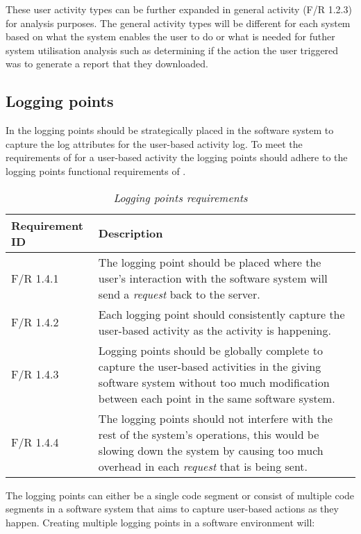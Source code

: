 These user activity types can be further expanded in general activity (F/R 1.2.3) for analysis purposes. The general activity types will be different for each system based on what the system enables the user to do or what is needed for futher system utilisation analysis such as determining if the action the user triggered was to generate a report that they downloaded.

\subsection{Logging points}\label{sec:ch2_loggingPoints}
In  the logging points should be strategically placed in the software system to capture the log attributes for the user-based activity log. To meet the requirements of  for a user-based activity the logging points should adhere to the logging points functional requirements of .

\begin{table}[!htb]
	\centering
	\caption[Logging points requirements]
	{\textit{Logging points requirements}}
	\label{tbl:ch2_loggingPointRequirement}
	\begin{tabularx}{\textwidth}{|l|X|}
		\hline \textbf{Requirement ID} & \textbf{Description} \\
		\hline F/R 1.4.1 & The logging point should be placed where the user's interaction with the software system will send a \textit{request} back to the server.\\
		\hline F/R 1.4.2 & Each logging point should consistently capture the user-based activity as the activity is happening. \\
		\hline F/R 1.4.3 & Logging points should be globally complete to capture the user-based activities in the giving software system without too much modification between each point in the same
		software system. \\
		\hline F/R 1.4.4 & The logging points should not interfere with the rest of the system's operations, this would be slowing down the system by causing too much overhead in each \textit{request}
		that is being sent. \\
		\hline
	\end{tabularx}
\end{table}

The logging points can either be a single code segment or consist of multiple code segments in a software system that aims to capture user-based actions as they happen. Creating multiple logging points in a software environment will:

